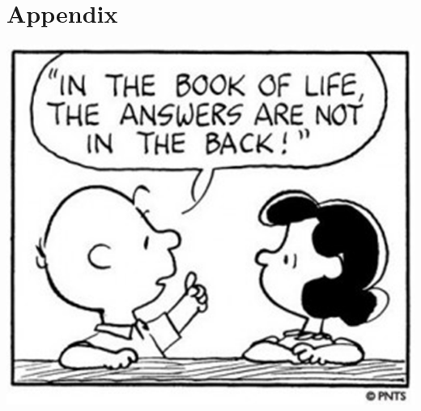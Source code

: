 \documentclass{tufte-handout}
\begin{document}
\newpage



\newpage

\part{Appendix}

\begin{marginfigure}%
	\begin{center}
		\includegraphics[width=1\linewidth]{ap-pic.png}
	\end{center}
\end{marginfigure}
\end{document}
